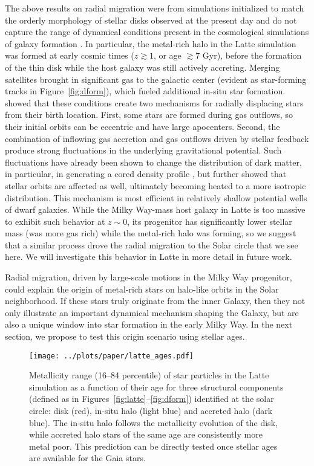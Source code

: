 \documentclass[apj, twocolappendix, numberedappendix, appendixfloats]{emulateapj}
\begin{document}
The above results on radial migration were from simulations initialized to match the orderly morphology of stellar disks observed at the present day and do not capture the range of dynamical conditions present in the cosmological simulations of galaxy formation \citep[e.g.,][]{agertz2009}.
In particular, the metal-rich halo in the Latte simulation was formed at early cosmic times ($z \gtrsim 1$, or age $\gtrsim 7$ Gyr), before the formation of the thin disk \citep{ma2016} while the host galaxy was still actively accreting.
Merging satellites brought in significant gas to the galactic center (evident as star-forming tracks in Figure~\ref{fig:dform}), which fueled additional in-situ star formation.
\citet{elbadry2016} showed that these conditions create two mechanisms for radially displacing stars from their birth location.
First, some stars are formed during gas outflows, so their initial orbits can be eccentric and have large apocenters.
Second, the combination of inflowing gas accretion and gas outflows driven by stellar feedback produce strong fluctuations in the underlying gravitational potential.
Such fluctuations have already been shown to change the distribution of dark matter, in particular, in generating a cored density profile \citep[e.g.,][]{pontzen2012, brooks2014, dicintio2014, chan:fire.dwarf.cusps}, but \citet{elbadry2016} further showed that stellar orbits are affected as well, ultimately becoming heated to a more isotropic distribution.
This mechanism is most efficient in relatively shallow potential wells of dwarf galaxies.
While the Milky Way-mass host galaxy in Latte is too massive to exhibit such behavior at $z \sim 0$, its progenitor has significantly lower stellar mass (was more gas rich) while the metal-rich halo was forming, so we suggest that a similar process drove the radial migration to the Solar circle that we see here.
We will investigate this behavior in Latte in more detail in future work.

Radial migration, driven by large-scale motions in the Milky Way progenitor, could explain the origin of metal-rich stars on halo-like orbits in the Solar neighborhood.
If these stars truly originate from the inner Galaxy, then they not only illustrate an important dynamical mechanism shaping the Galaxy, but are also a unique window into star formation in the early Milky Way.
In the next section, we propose to test this origin scenario using stellar ages.


\begin{figure}
\begin{center}
\texttt{[image: ../plots/paper/latte\_ages.pdf]}
\caption{Metallicity range (16--84 percentile) of star particles in the Latte simulation as a function of their age for three structural components (defined as in Figures~\ref{fig:latte}--\ref{fig:dform}) identified at the solar circle: disk (red), in-situ halo (light blue) and accreted halo (dark blue).
The in-situ halo follows the metallicity evolution of the disk, while accreted halo stars of the same age are consistently more metal poor.
This prediction can be directly tested once stellar ages are available for the Gaia stars.}
\label{fig:ages}
\end{center}
\end{figure}
\end{document}
